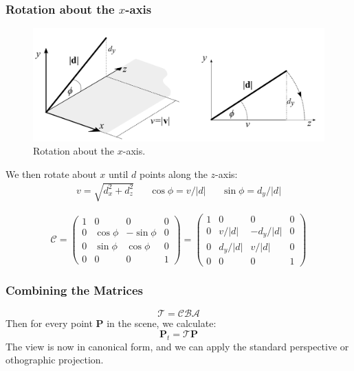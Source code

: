 \documentclass[11pt]{article}
\begin{document}
\subsubsection{Rotation about the $x$-axis}
\begin{figure}[htb!]
  \caption{Rotation about the $x$-axis.}
  \includegraphics[scale=0.2]{rotx}
  \centering
\end{figure}

We then rotate about $x$ until $d$ points along the $z$-axis:
\begin{align*}
  v = \sqrt{d_x^2 + d_z^2} && \cos \phi = v / \lvert d \rvert && \sin \phi = d_y / \lvert d \rvert
\end{align*}

\[
  \mathcal{C} =
  \begin{pmatrix}
    1 & 0 & 0 & 0 \\
    0 & \cos \phi & -\sin \phi & 0 \\
    0 & \sin \phi & \cos \phi & 0 \\
    0 & 0 & 0 & 1
  \end{pmatrix}
  =
  \begin{pmatrix}
    1 & 0 & 0 & 0 \\
    0 & v / \lvert d \rvert & -d_y / \lvert d \rvert & 0 \\
    0 & d_y / \lvert d \rvert & v / \lvert d \rvert & 0 \\
    0 & 0 & 0 & 1
  \end{pmatrix}
\]

\subsubsection{Combining the Matrices}
\[
  \mathcal{T} = \mathcal{CBA}  
\]
Then for every point $\textbf{P}$ in the scene, we calculate:
\[
  \textbf{P}_t = \mathcal{T}\textbf{P}  
\]
The view is now in canonical form, and we can apply the standard perspective or othographic projection.
\end{document}
